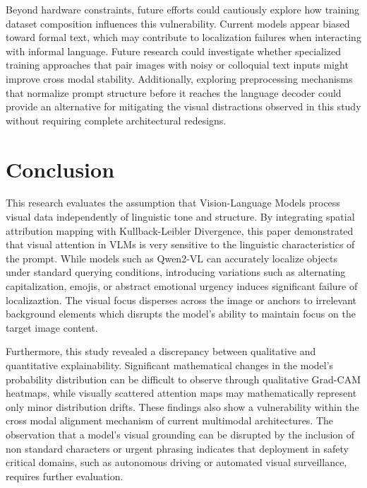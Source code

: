 \documentclass[11pt, letterpaper]{article}
\begin{document}
Beyond hardware constraints, future efforts could cautiously explore how training dataset composition influences this vulnerability. Current models appear biased toward formal text, which may contribute to localization failures when interacting with informal language. Future research could investigate whether specialized training approaches that pair images with noisy or colloquial text inputs might improve cross modal stability. Additionally, exploring preprocessing mechanisms that normalize prompt structure before it reaches the language decoder could provide an alternative for mitigating the visual distractions observed in this study without requiring complete architectural redesigns.
\section{Conclusion}
This research evaluates the assumption that Vision-Language Models process visual data independently of linguistic tone and structure. By integrating spatial attribution mapping with Kullback-Leibler Divergence, this paper demonstrated that visual attention in VLMs is very sensitive to the linguistic characteristics of the prompt. While models such as Qwen2-VL can accurately localize objects under standard querying conditions, introducing variations such as alternating capitalization, emojis, or abstract emotional urgency induces significant failure of localizaztion. The visual focus disperses across the image or anchors to irrelevant background elements which disrupts the model's ability to maintain focus on the target image content. 

Furthermore, this study revealed a discrepancy between qualitative and quantitative explainability. Significant mathematical changes in the model's probability distribution can be difficult to observe through qualitative Grad-CAM heatmaps, while visually scattered attention maps may mathematically represent only minor distribution drifts. These findings also show a vulnerability within the cross modal alignment mechanism of current multimodal architectures. The observation that a model's visual grounding can be disrupted by the inclusion of non standard characters or urgent phrasing indicates that deployment in safety critical domains, such as autonomous driving or automated visual surveillance, requires further evaluation. 
\end{document}
